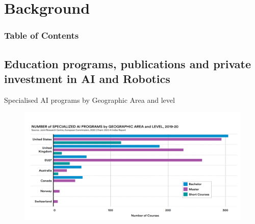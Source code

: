 \section{Background}


\begin{frame}
      \frametitle{Table of Contents}
      \tableofcontents[currentsection]
\end{frame}



\subsection{Education programs, publications and private investment in AI and Robotics}

{

\begin{frame}{Specialised AI programs by Geographic Area and level}

\begin{figure}
 \centering
 \includegraphics[width=1.0\textwidth]{./figures/progress-of-air-a/outputs/drawing-v00.png}
\end{figure}

\end{frame}
}



